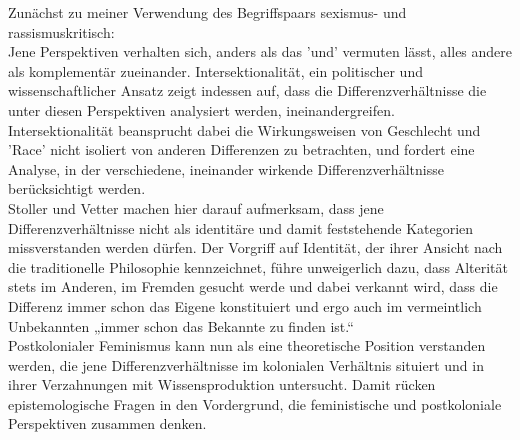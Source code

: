 \noindent Zunächst zu meiner Verwendung des Begriffspaars sexismus- und
rassismuskritisch:\\
Jene Perspektiven verhalten sich, anders als das 'und'
vermuten lässt, alles andere als komplementär zueinander. Intersektionalität,
ein politischer und wissenschaftlicher Ansatz zeigt indessen auf, dass die
Differenzverhältnisse die unter diesen Perspektiven analysiert werden,
ineinandergreifen.\\
Intersektionalität beansprucht dabei die Wirkungsweisen von Geschlecht und
'Race' nicht isoliert von anderen Differenzen zu betrachten, und fordert eine
Analyse, in der verschiedene, ineinander wirkende Differenzverhältnisse
berücksichtigt werden. \\
Stoller und Vetter machen hier darauf aufmerksam, dass
jene Differenzverhältnisse nicht als identitäre und damit feststehende
Kategorien missverstanden werden dürfen. Der Vorgriff auf Identität, der ihrer
Ansicht nach die traditionelle Philosophie kennzeichnet, führe unweigerlich
dazu, dass Alterität stets im Anderen, im Fremden gesucht werde und dabei
verkannt wird, dass die Differenz immer schon das Eigene konstituiert und ergo
auch im vermeintlich Unbekannten „immer schon das Bekannte zu finden ist.“
\footnotemark {}\\

\noindent Postkolonialer Feminismus kann nun als eine theoretische Position verstanden
werden, die jene Differenzverhältnisse im kolonialen Verhältnis situiert und in
ihrer Verzahnungen mit Wissensproduktion untersucht. Damit rücken
epistemologische Fragen in den Vordergrund, die feministische und postkoloniale
Perspektiven zusammen denken.\\

